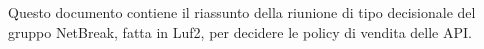 Questo documento contiene il riassunto della riunione di tipo decisionale del gruppo NetBreak, fatta in Luf2, per decidere le policy di vendita delle API.

